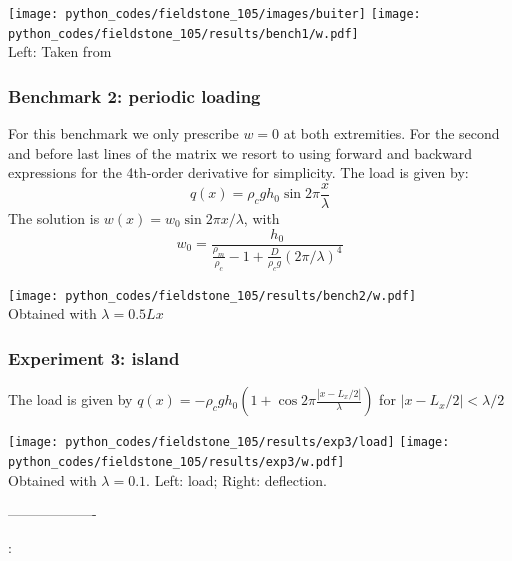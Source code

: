 \begin{center}
\texttt{[image: python\_codes/fieldstone\_105/images/buiter]}
\texttt{[image: python\_codes/fieldstone\_105/results/bench1/w.pdf]}\\
{\captionfont Left: Taken from \cite{buiter_thesis}}
\end{center}


\subsubsection*{Benchmark 2: periodic loading}

For this benchmark we only prescribe $w=0$ at both extremities.
For the second and before last lines of the matrix we resort to 
using forward and backward expressions for the 4th-order 
derivative for simplicity.
The load is given by:
\[
q(x)=\rho_c g h_0 \sin 2\pi \frac{x}{\lambda}
\]
The solution is $w(x)=w_0 \sin 2\pi x/\lambda$, with 
\[
w_0=\frac{h_0}{\frac{\rho_m}{\rho_c}-1+\frac{D}{\rho_c g} (2\pi/\lambda)^4}
\]

\begin{center}
\texttt{[image: python\_codes/fieldstone\_105/results/bench2/w.pdf]}\\
{\captionfont Obtained with $\lambda=0.5Lx$}
\end{center}

\subsubsection*{Experiment 3: island}

The load is given by $q(x)=-\rho_c g h_0 \left(1+\cos 2\pi \frac{|x-L_x/2|}{\lambda}\right) $
for $|x-L_x/2|<\lambda/2$ 

\begin{center}
\texttt{[image: python\_codes/fieldstone\_105/results/exp3/load]}
\texttt{[image: python\_codes/fieldstone\_105/results/exp3/w.pdf]}\\
{\captionfont Obtained with $\lambda=0.1$. Left: load; Right: deflection.}
\end{center}

-------------------

\Literature: \\


